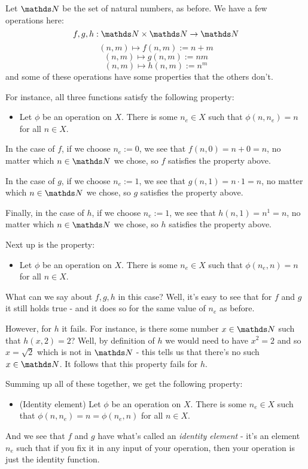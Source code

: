 \begin{ex}
	Let $\N$ be the set of natural numbers, as before. We have a few operations here:
	\[f,g,h:\N\times\N \to \N\]
	\[(n,m)\mapsto f(n,m):=n+m\]
	\[(n,m)\mapsto g(n,m):=nm\]
	\[(n,m)\mapsto h(n,m):=n^m\]and some of these operations have some properties that the others don't.
	
	For instance, all three functions satisfy the following property:
	
	\begin{itemize}
		\item Let $\phi$ be an operation on $X$. There is some $n_e\in X$ such that $\phi(n,n_e)=n$ for all $n\in X$.
	\end{itemize}

	In the case of $f$, if we choose $n_e:=0$, we see that $f(n,0)=n+0=n$, no matter which $n\in \N$ we chose, so $f$ satisfies the property above.
	
	In the case of $g$, if we choose $n_e:=1$, we see that $g(n,1)=n\cdot1=n$, no matter which $n\in\N$ we chose, so $g$ satisfies the property above.
	
	Finally, in the case of $h$, if we choose $n_e:=1$, we see that $h(n,1)=n^1=n$, no matter which $n\in\N$ we chose, so $h$ satisfies the property above.
	
	\bigskip
	Next up is the property:
	
	\begin{itemize}
		\item Let $\phi$ be an operation on $X$. There is some $n_e\in X$ such that $\phi(n_e,n)=n$ for all $n\in X$.
	\end{itemize}

	What can we say about $f,g,h$ in this case? Well, it's easy to see that for $f$ and $g$ it still holds true - and it does so for the same value of $n_e$ as before.
	
	However, for $h$ it fails. For instance, is there some number $x\in\N$ such that $h(x,2)=2$? Well, by definition of $h$ we would need to have $x^2=2$ and so $x=\sqrt{2}$ which is not in $\N$ - this tells us that there's no such $x\in\N$. It follows that this property fails for $h$.
	
	\bigskip
	Summing up all of these together, we get the following property:
	\begin{itemize}
		\item (Identity element) Let $\phi$ be an operation on $X$. There is some $n_e\in X$ such that $\phi(n,n_e)=n=\phi(n_e,n)$ for all $n\in X$.
	\end{itemize}
	And we see that $f$ and $g$ have what's called an \textit{identity element} - it's an element $n_e$ such that if you fix it in any input of your operation, then your operation is just the identity function.
	

\end{ex}
